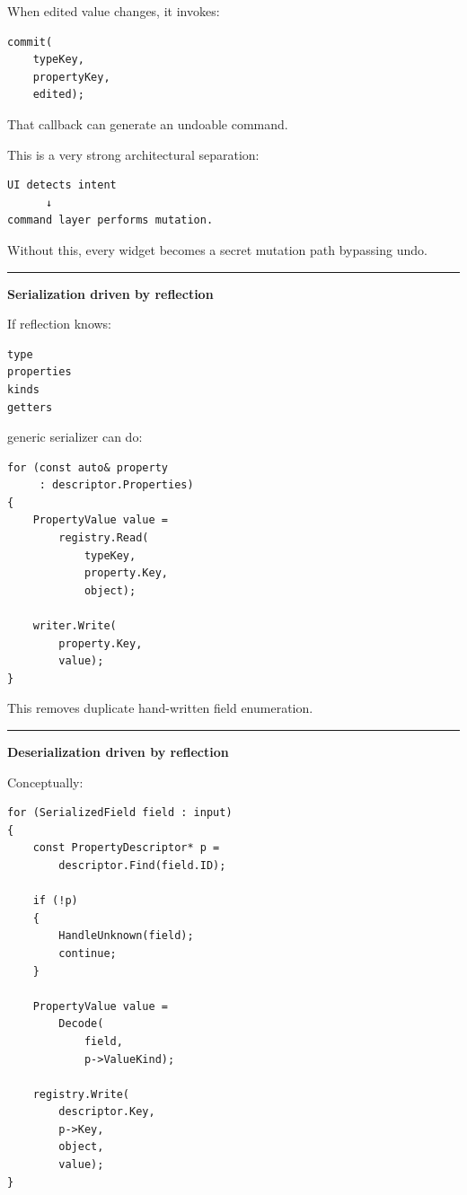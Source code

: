 When edited value changes, it invokes:

\begin{verbatim}
commit(
    typeKey,
    propertyKey,
    edited);
\end{verbatim}

That callback can generate an undoable command.

This is a very strong architectural separation:

\begin{verbatim}
UI detects intent
      ↓
command layer performs mutation.
\end{verbatim}

Without this, every widget becomes a secret mutation path bypassing undo.

\begin{center}\rule{0.5\linewidth}{0.5pt}\end{center}

\textbf{Serialization driven by reflection}

If reflection knows:

\begin{verbatim}
type
properties
kinds
getters
\end{verbatim}

generic serializer can do:

\begin{verbatim}
for (const auto& property
     : descriptor.Properties)
{
    PropertyValue value =
        registry.Read(
            typeKey,
            property.Key,
            object);

    writer.Write(
        property.Key,
        value);
}
\end{verbatim}

This removes duplicate hand-written field enumeration.

\begin{center}\rule{0.5\linewidth}{0.5pt}\end{center}

\textbf{Deserialization driven by reflection}

Conceptually:

\begin{verbatim}
for (SerializedField field : input)
{
    const PropertyDescriptor* p =
        descriptor.Find(field.ID);

    if (!p)
    {
        HandleUnknown(field);
        continue;
    }

    PropertyValue value =
        Decode(
            field,
            p->ValueKind);

    registry.Write(
        descriptor.Key,
        p->Key,
        object,
        value);
}
\end{verbatim}

